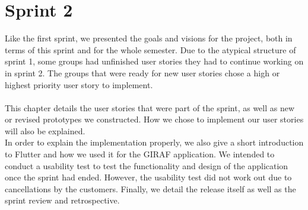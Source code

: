 \chapter{Sprint 2}
Like the first sprint, we presented the goals and visions for the project, both in terms of this sprint and for the whole semester.
Due to the atypical structure of sprint 1, some groups had unfinished user stories they had to continue working on in sprint 2.
The groups that were ready for new user stories chose a high or highest priority user story to implement.
\\\\
This chapter details the user stories that were part of the sprint, as well as new or revised prototypes we constructed.
How we chose to implement our user stories will also be explained.
\\
In order to explain the implementation properly, we also give a short introduction to Flutter and how we used it for the GIRAF application.
We intended to conduct a usability test to test the functionality and design of the application once the sprint had ended.
However, the usability test did not work out due to cancellations by the customers. 
Finally, we detail the release itself as well as the sprint review and retrospective.
